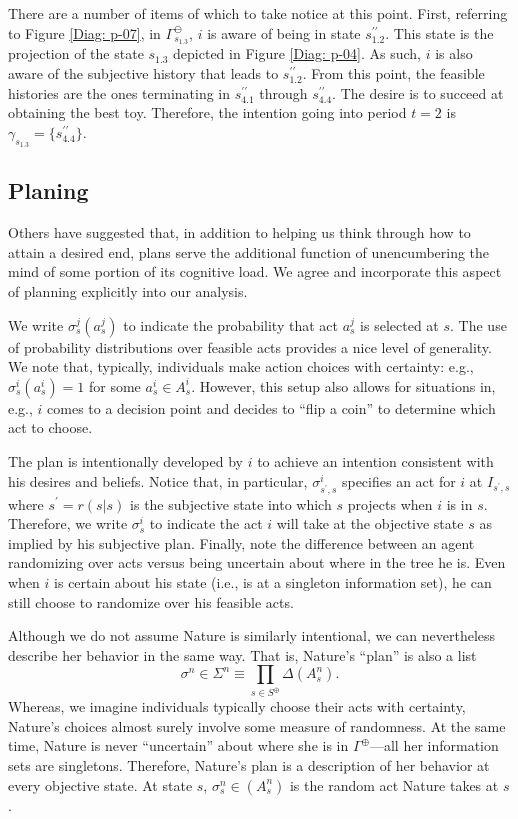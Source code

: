 \documentclass[
11pt,
titlepage,
reqno,
]{article}%
\theoremstyle{definition}
\begin{document}
There are a number of items of which to take notice at this point.
First, referring to Figure \ref{Diag: p-07}, in $\Gamma^\ominus_{s_{1.3}} $, $i$ is aware of being in state $s^{\prime\prime}_{1.2}$.
This state is the projection of the state  $s_{1.3}$ depicted in Figure \ref{Diag: p-04}.
As such, $i$ is also aware of the subjective history that leads to $s^{\prime\prime}_{1.2}$.
From this point, the feasible histories are the ones terminating in $s^{\prime\prime}_{4.1}$ through $s^{\prime\prime}_{4.4}$.
The desire is to succeed at obtaining the best toy.
Therefore, the intention going into period $t=2$ is $\gamma_{s_{1.3}}=\{s^{\prime\prime}_{4.4}\}$.


 

\clearpage


\subsection{Planing}
Others have suggested that, in addition to helping us think through how to attain a desired end, plans serve the additional function of unencumbering the mind of some portion of its cognitive load. 
We agree and incorporate this aspect of planning explicitly into our analysis.

We write $\sigma^j_s(a^j_s)$ to indicate the probability that act $a^j_{s}$ is selected at $s$.
The use of probability distributions over feasible acts provides a nice level of generality.
We note that, typically, individuals make action choices with certainty: e.g., $\sigma^i_s(a^i_s) =1$ for some $a^i_s\in A^i_s$.
However, this setup also allows for situations in, e.g., $i$ comes to a decision point and decides to ``flip a coin'' to determine which act to choose.

The plan is intentionally developed by $i$ to achieve an intention consistent with his desires and beliefs.
Notice that, in particular, $\sigma^i_{s^\prime,s}$ specifies an act for $i$ at $I_{s^\prime,s}$ where $s^\prime=r(s|s)$ is the subjective state into which  $s$ projects when $i$ is in $s$.
Therefore,  we write $\sigma^i_s$ to indicate the act $i$ will take at the objective state $s$ as implied by his subjective plan.
Finally, note the difference between an agent randomizing over acts versus being uncertain about where in the tree he is. 
Even when $i$ is certain about his state (i.e., is at a singleton information set), he can still choose to randomize over his feasible acts.

Although we do not assume Nature is similarly intentional, we can nevertheless describe her behavior in the same way. 
That is, Nature's ``plan'' is also a list
\[
\sigma^n\in\Sigma^n\equiv \prod_{s\in S^\oplus}\Delta(A^n_s).
\]
Whereas, we imagine individuals typically choose their acts with certainty, Nature's choices almost surely involve some measure of randomness.
At the same time, Nature is never ``uncertain'' about where she is in $\Gamma^\oplus$---all her information sets are singletons.
Therefore, Nature's plan is a description of her behavior at every objective state.
At state $s$, $\sigma^n_s\in (A^n_s)$ is the random act Nature takes at $s$.
\end{document}
